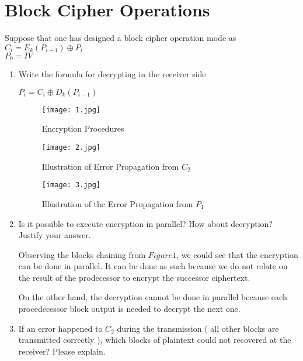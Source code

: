 \documentclass[12]{article}
\begin{document}
\section{ Block Cipher Operations }

Suppose that one has designed a block cipher operation mode as \\

$C_i = E_k(P_{i - 1 }) \oplus P_i$ \\
$P_0 = IV$

\begin{enumerate}
	 \item  Write the formula for decrypting in the receiver side
		
		$P_i =  C_i \oplus D_k( P_{ i - 1 })$
		
		
		\begin{figure}
			
				\texttt{[image: 1.jpg]}
				\caption{ Encryption Procedures }	
				\label{Figure1:Encryption}		
			
		\end{figure}		
		
		\begin{figure}
			
				\texttt{[image: 2.jpg]}
				\caption{ Illustration of Error Propagation from $C_2$ }	
				\label{Figure1:Encryption}		
			
		\end{figure}		
		
		\begin{figure}
			
				\texttt{[image: 3.jpg]}
				\caption{ Illustration of the Error Propagation from $P_1$}	
				\label{Figure1:Encryption}		
			
		\end{figure}		
		
		
		
	\item  Is it possible to execute encryption in parallel? How about decryption? Justify your answer.
	
	Observing the  blocks chaining from $Figure1$, we could see that the
	encryption can be done in parallel. It can be done as such because we do not relate on the result of the prodecessor to encrypt the successor ciphertext. 
	
	On the other hand, the decryption cannot be done in parallel because each procedecessor block output is needed to decrypt the next one. 
	
	\item If an error happened to  $C_2$ during  the transmission ( all other blocks are transmitted correctly ), which blocks of plaintext could not recovered at the receiver? Please explain. 
	

\end{enumerate}
\end{document}
